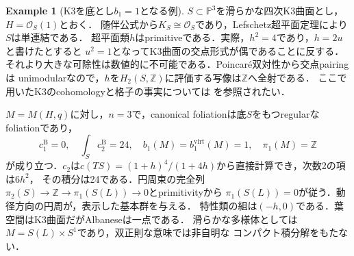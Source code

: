 \documentclass[12pt]{amsart}
\theoremstyle{definition}
\newtheorem{eg}[thm]{Example}
\theoremstyle{remark}
\numberwithin{equation}{section}
\newcommand{\cO}{\mathcal{O}}
\newcommand{\Z}{\mathbb{Z}}
\newcommand{\mP}{\mathbb{P}}
\newcommand{\bas}{\mathrm{B}}
\newcommand{\virt}{\mathrm{virt}}
\begin{document}
\begin{eg}[K3を底とし$b_1=1$となる例]\label{eg:k3}
$S\subset\mP^3$を滑らかな四次K3曲面とし，$H=\cO_S(1)$とおく．
随伴公式から$K_S\cong\cO_S$であり，Lefschetz超平面定理により$S$は単連結である．
超平面類$h$はprimitiveである．実際，$h^2=4$であり，$h=2u$と書けたとすると
$u^2=1$となってK3曲面の交点形式が偶であることに反する．
それより大きな可除性は数値的に不可能である．Poincar\'e双対性から交点pairingは
unimodularなので，$h$を$H_2(S,\Z)$に評価する写像は$\Z$へ全射である．
ここで用いたK3のcohomologyと格子の事実については
\cite[Chapters 1 and 14]{Huybrechts}を参照されたい．

$M=M(H,q)$に対し，$n=3$で，canonical foliationは底$S$をもつregularなfoliationであり，
\begin{equation}\label{eq:k3numbers}
c_1^{\bas}=0,\quad \int_S c_2^{\bas}=24,\quad
b_1(M)=b_1^{\virt}(M)=1,\quad \pi_1(M)=\Z
\end{equation}
が成り立つ．$c_2$は$c(TS)=(1+h)^4/(1+4h)$から直接計算でき，次数2の項は$6h^2$，
その積分は24である．円周束の完全列
$\pi_2(S)\to\Z\to\pi_1(S(L))\to0$とprimitivityから
$\pi_1(S(L))=0$が従う．動径方向の円周が，表示した基本群を与える．
特性類の組は$(-h,0)$である．葉空間はK3曲面だがAlbaneseは一点である．
滑らかな多様体としては$M=S(L)\times S^1$であり，双正則な意味では非自明な
コンパクト積分解をもたない．
\end{eg}
\end{document}
